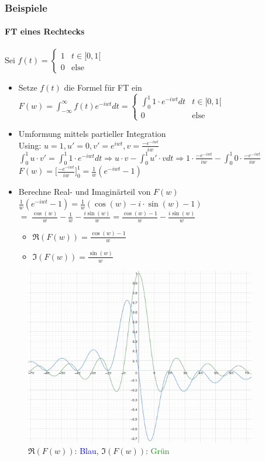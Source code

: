 \documentclass[12pt,a4paper]{article}
\newcommand{\blue}[1]{\textcolor{blue} {#1}}
\newcommand{\green}[1]{\textcolor{ForestGreen} {#1}}
\newcommand{\nl}{\\[0.1cm]}
\begin{document}
\subsubsection{Beispiele}
\paragraph{FT eines Rechtecks}
Sei $f(t) = \begin{cases}1& t\in[0,1[ \\ 0&\text{else} \end{cases}$
\begin{itemize}
\item Setze $f(t)$ die Formel für FT ein\nl
$\displaystyle F(w) = \int_{-\infty}^{\infty} f(t) e^{-iwt} dt = \begin{cases} \displaystyle\int_0^1 1\cdot e^{-iwt} dt & t\in[0,1[ \\ 0 & \text{else} \end{cases}$
\item Umformung mittels partieller Integration\nl
Using: $u=1, u'=0, v'=e^{iwt}, v=\frac{-e^{-iwt}}{iw}$\nl
$\displaystyle \int_0^1 u\cdot v' = \int_0^1 1\cdot e^{-iwt} dt \Rightarrow u\cdot v - \int_0^1 u'\cdot v dt \Rightarrow 1\cdot \frac{-e^{-iwt}}{iw} - \int_0^1 0\cdot \frac{-e^{-iwt}}{iw}$\nl
$\displaystyle F(w) = \big[\frac{-e^{-iwt}}{iw}\big]^1_0 = \frac{1}{w}(e^{-iwt}-1)$
\item Berechne Real- und Imaginärteil von $F(w)$\nl
$\frac{1}{w}(e^{-iwt}-1) = \frac{1}{w}(\cos(w) - i\cdot \sin(w) -1)$\\
$=\;\frac{\cos(w)}{w} - \frac{1}{w} -\frac{i\sin(w)}{w} = \frac{\cos(w) -1 }{w} - \frac{i\sin(w)}{w}$\nl
\begin{itemize}
\item $\Re(F(w)) = \frac{\cos(w)-1}{w}$
\item $\Im(F(w)) = \frac{\sin(w)}{w}$
\end{itemize}
\end{itemize}
\begin{figure}[H]
\includegraphics[width=0.9\textwidth]{./resources/ft_res.png}
\caption{$\Re(F(w))$: \blue{Blau}, $\Im(F(w))$: \green{Grün}}
\end{figure}
\end{document}
